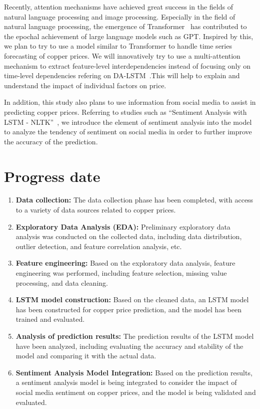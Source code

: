\documentclass[project-plan]{report-template}
\begin{document}
\noindent Recently, attention mechanisms have achieved great success in the fields of natural language processing and image processing. Especially in the field of natural language processing, the emergence of Transformer~\cite{li2019enhancing, vaswani2017attention} has contributed to the epochal achievement of large language models such as GPT. Inspired by this, we plan to try to use a model similar to Transformer to handle time series forecasting of copper prices. We will innovatively try to use a multi-attention mechanism to extract feature-level interdependencies instead of focusing only on time-level dependencies refering on DA-LSTM~\cite{qin2017dualstage}.This will help to explain and understand the impact of individual factors on price.

\noindent In addition, this study also plans to use information from social media to assist in predicting copper prices. Referring to studies such as “Sentiment Analysis with LSTM - NLTK”~\cite{8848203}, we introduce the element of sentiment analysis into the model to analyze the tendency of sentiment on social media in order to further improve the accuracy of the prediction.

\section{Progress date}
\begin{enumerate}
    \item \textbf{Data collection:} The data collection phase has been completed, with access to a variety of data sources related to copper prices.
    
    \item \textbf{Exploratory Data Analysis (EDA):} Preliminary exploratory data analysis was conducted on the collected data, including data distribution, outlier detection, and feature correlation analysis, etc.
    
    \item \textbf{Feature engineering:} Based on the exploratory data analysis, feature engineering was performed, including feature selection, missing value processing, and data cleaning.
    
    \item \textbf{LSTM model construction:} Based on the cleaned data, an LSTM model has been constructed for copper price prediction, and the model has been trained and evaluated.
    
    \item \textbf{Analysis of prediction results:} The prediction results of the LSTM model have been analyzed, including evaluating the accuracy and stability of the model and comparing it with the actual data.
    
    \item \textbf{Sentiment Analysis Model Integration:} Based on the prediction results, a sentiment analysis model is being integrated to consider the impact of social media sentiment on copper prices, and the model is being validated and evaluated.
\end{enumerate}
\end{document}
